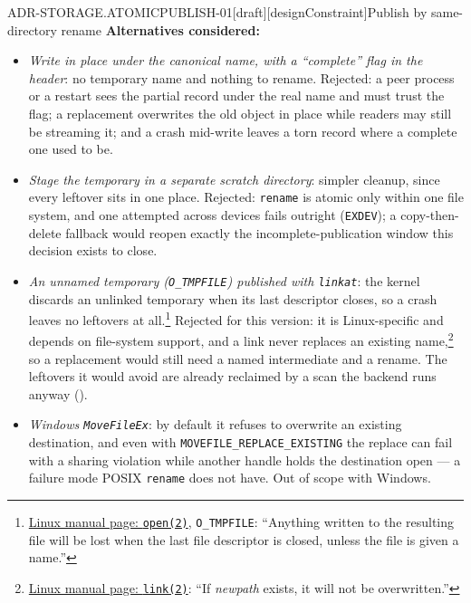 \begin{requirement}{ADR-STORAGE.ATOMICPUBLISH-01}[draft][designConstraint]{Publish by same-directory rename}
  \textbf{Alternatives considered:}
  \begin{itemize}
    \item \emph{Write in place under the canonical name, with a ``complete''
      flag in the header}: no temporary name and nothing to rename. Rejected:
      a peer process or a restart sees the partial record under the real
      name and must trust the flag; a replacement overwrites the old object
      in place while readers may still be streaming it; and a crash mid-write
      leaves a torn record where a complete one used to be.
    \item \emph{Stage the temporary in a separate scratch directory}:
      simpler cleanup, since every leftover sits in one place. Rejected:
      \texttt{rename} is atomic only within one file system, and one attempted
      across devices fails outright (\texttt{EXDEV}); a copy-then-delete
      fallback would reopen exactly the incomplete-publication window this
      decision exists to close.
    \item \emph{An unnamed temporary (\texttt{O\_TMPFILE}) published with
      \texttt{linkat}}: the kernel discards an unlinked temporary when its last
      descriptor closes, so a crash leaves no leftovers at
      all.\footnote{\href{https://man7.org/linux/man-pages/man2/open.2.html}{Linux
      manual page: \texttt{open(2)}}, \texttt{O\_TMPFILE}: ``Anything written
      to the resulting file will be lost when the last file descriptor is
      closed, unless the file is given a name.''} Rejected for this version:
      it is Linux-specific and depends on file-system support, and a link
      never replaces an existing
      name,\footnote{\href{https://man7.org/linux/man-pages/man2/link.2.html}{Linux
      manual page: \texttt{link(2)}}: ``If \emph{newpath} exists, it will not
      be overwritten.''} so a replacement would still need a named
      intermediate and a rename. The leftovers it would avoid are already
      reclaimed by a scan the backend runs anyway
      ().
    \item \emph{Windows \texttt{MoveFileEx}}: by default it refuses to
      overwrite an existing destination, and even with
      \texttt{MOVEFILE\_REPLACE\_EXISTING} the replace can fail with a sharing
      violation while another handle holds the destination open --- a failure
      mode POSIX \texttt{rename} does not have. Out of scope with Windows.
  \end{itemize}


\end{requirement}
